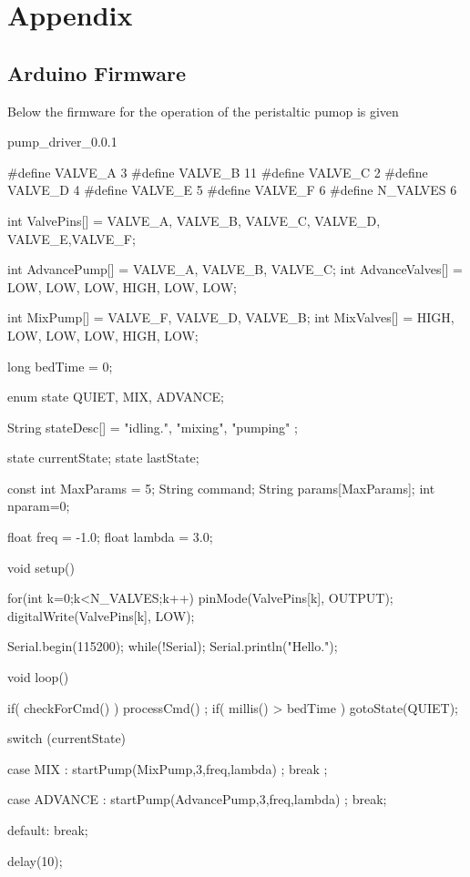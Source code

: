 \chapter{Appendix} \label{Chapter:Appendix}

\section{Arduino Firmware}

Below the firmware for the operation of the peristaltic pumop is given

pump_driver_0.0.1

#define VALVE_A 3
#define VALVE_B 11
#define VALVE_C 2
#define VALVE_D 4
#define VALVE_E 5
#define VALVE_F 6
#define N_VALVES 6

int ValvePins[] = {VALVE_A, VALVE_B, VALVE_C, VALVE_D, VALVE_E,VALVE_F};

int AdvancePump[] = {VALVE_A, VALVE_B, VALVE_C};
int AdvanceValves[] = {LOW, LOW, LOW, HIGH, LOW, LOW};

int MixPump[] = {VALVE_F, VALVE_D, VALVE_B};
int MixValves[] = {HIGH, LOW, LOW, LOW, HIGH, LOW};


long bedTime = 0;


enum state  {QUIET, MIX, ADVANCE};

String stateDesc[] = {"idling.", "mixing", "pumping"} ;

state currentState;
state lastState;

const int MaxParams = 5;
String command;
String params[MaxParams];
int nparam=0;

float  freq = -1.0;
float lambda = 3.0;

void setup() {

  for(int k=0;k<N_VALVES;k++)
    {
      pinMode(ValvePins[k], OUTPUT);
      digitalWrite(ValvePins[k], LOW);
    }

   Serial.begin(115200);
   while(!Serial);
   Serial.println("Hello.");
}

void loop() {
  if( checkForCmd() ) processCmd()  ;
  if( millis() > bedTime ) gotoState(QUIET);

  switch (currentState) {
    case MIX :
      startPump(MixPump,3,freq,lambda) ;
      break ;

    case ADVANCE :
      startPump(AdvancePump,3,freq,lambda) ;
      break;

    default:
      break;
  }

  delay(10);
}


